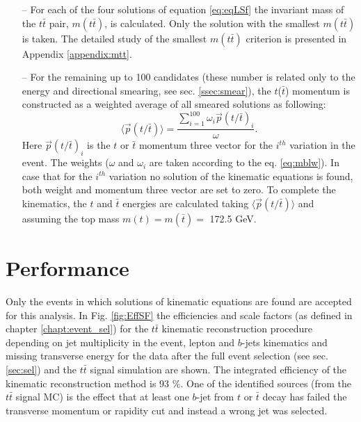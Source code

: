 \begin{itemize}
 \item [--] For each of the four solutions of equation \ref{eq:eqLSf} the invariant mass of the $t\bar{t}$ pair, $m(t\bar{t})$, is calculated. Only
 the solution with the smallest $m(t\bar{t})$ is taken. The detailed study of the smallest $m(t\bar{t})$ criterion is presented in Appendix \ref{appendix:mtt}. 
 \item [--] For the remaining up to 100 candidates (these number is related only to the energy and directional smearing, see sec. \ref{ssec:smear}), the $t$($\bar{t}$) 
 momentum is constructed as a weighted average of all smeared solutions as following:
 \begin{equation}
  \langle{\vec{p}(t/\bar{t})}\rangle = \frac{\sum\limits_{i=1}^{100} \omega_{i} \vec{p}(t/\bar{t})_i}{\omega}.
 \end{equation}
 Here $\vec{p}(t/ \bar{t})_{i}$ is the $t$ or $\bar{t}$ momentum three vector for the $i^{th}$ variation in the event. The weights ($\omega$ and $\omega_{i}$ are taken according 
 to the eq. \ref{eq:mblw}).
 In case that for the $i^{th}$ variation no solution of the kinematic equations is found, both weight and momentum three vector are set to zero. To complete the kinematics,
 the $t$ and $\bar{t}$ energies are calculated taking $\langle{\vec{p}(t/\bar{t})}\rangle$ and assuming the top mass $m(t) = m(\bar{t}) = $ 172.5 GeV.
\end{itemize}

\section{Performance}\label{sec:kinRecPerf}

Only the events in which solutions of kinematic equations are found are accepted for this analysis. 
In Fig. \ref{fig:EffSF} the efficiencies and scale factors (as defined in chapter \ref{chapt:event_sel}) for the $t\bar{t}$ kinematic reconstruction procedure 
depending on jet multiplicity in the event, lepton and $b$-jets kinematics and missing transverse energy for the data after the full event selection
(see sec. \ref{sec:sel}) and the $t\bar{t}$ signal simulation are shown. The integrated efficiency of the kinematic reconstruction method is 93 $\%$. One of
the identified sources (from the $t\bar{t}$ signal MC) is the effect that at least one $b$-jet from $t$ or $\bar{t}$ decay has failed the transverse
momentum or rapidity cut and instead a wrong jet was selected.

